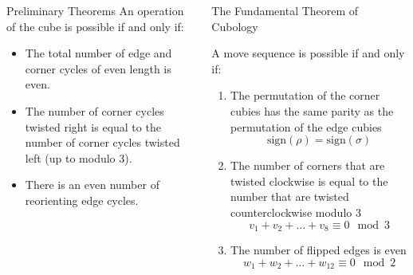 \documentclass[final]{beamer}
\newlength{\colwidth}
\begin{document}
\begin{frame}[t]
\begin{columns}[t]
\begin{column}{\colwidth}
\begin{block}{Preliminary Theorems}
      An operation of the cube is possible if and only if:
            \begin{itemize}
              \item The total number of edge and corner cycles of even length is even.
              \item The number of corner cycles twisted right is equal to the number of corner cycles twisted left (up to modulo $3$).
              \item There is an even number of reorienting edge cycles.








    \end{itemize}

  \end{block}
  


\end{column}

\begin{column}{\colwidth}

  \begin{alertblock}{The Fundamental Theorem of Cubology}
    
    A move sequence is possible if and only if: 

    \begin{enumerate}
      \item The permutation of the corner cubies has the same parity as the permutation of the edge cubies 
      $$\text{sign}(\rho) = \text{sign}(\sigma)$$
      \item The number of corners that are twisted clockwise is equal to the number that are twisted counterclockwise modulo $3$
      $$v_{1} + v_{2} +\dots +v_{8} \equiv 0 \mod 3$$
      \item The number of flipped edges is even
      $$w_{1} + w_{2} +\dots +w_{12} \equiv 0 \mod 2$$
    \end{enumerate}


\end{alertblock}
\end{column}
\end{columns}
\end{frame}
\end{document}
